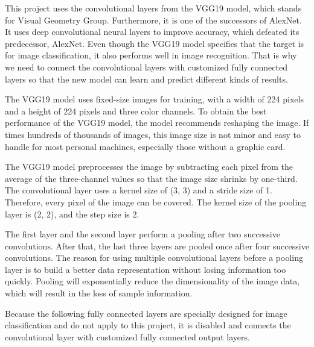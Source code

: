 \documentclass{article}
\begin{document}
This project uses the convolutional layers from the VGG19 model, which stands for Visual Geometry Group. Furthermore, it is one of the successors of AlexNet. It uses deep convolutional neural layers to improve accuracy, which defeated its predecessor, AlexNet. Even though the VGG19 model specifies that the target is for image classification, it also performs well in image recognition. That is why we need to connect the convolutional layers with customized fully connected layers so that the new model can learn and predict different kinds of results. 

The VGG19 model uses fixed-size images for training, with a width of 224 pixels and a height of 224 pixels and three color channels. To obtain the best performance of the VGG19 model, the model recommends reshaping the image. If times hundreds of thousands of images, this image size is not minor and easy to handle for most personal machines, especially those without a graphic card. 

The VGG19 model preprocesses the image by subtracting each pixel from the average of the three-channel values so that the image size shrinks by one-third. The convolutional layer uses a kernel size of (3, 3) and a stride size of 1. Therefore, every pixel of the image can be covered. The kernel size of the pooling layer is (2, 2), and the step size is 2.

The first layer and the second layer perform a pooling after two successive convolutions. After that, the last three layers are pooled once after four successive convolutions. The reason for using multiple convolutional layers before a pooling layer is to build a better data representation without losing information too quickly. Pooling will exponentially reduce the dimensionality of the image data, which will result in the loss of sample information.

Because the following fully connected layers are specially designed for image classification and do not apply to this project, it is disabled and connects the convolutional layer with customized fully connected output layers.
\end{document}
